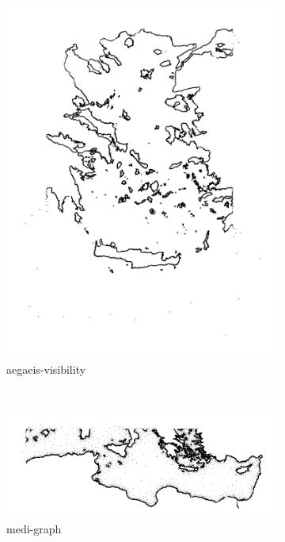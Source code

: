 \begin{figure}
\begin{subfigure}[b]{0.35\textwidth}
        \includegraphics[width=\textwidth]{img/base_graphs/aegaeis-ref-visibility.png}
        \caption{aegaeis-visibility}
    \end{subfigure}
    \\
    \begin{subfigure}[b]{0.35\textwidth}
        \centering
        \includegraphics[width=\textwidth]{img/base_graphs/medi-ref-graph.png}
        \caption{medi-graph}
    \end{subfigure}
    \hfill
    \begin{subfigure}[b]{0.35\textwidth}

\end{subfigure}
\end{figure}
